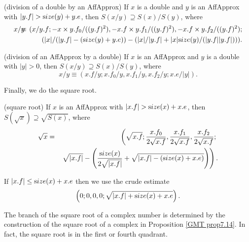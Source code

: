 \begin{proposition}{\label{GMT prop6.9} {\textrm (division of a double by an AffApprox)}} If $x$ is a double and $y$ is an {\textrm AffApprox }
 with $|y.f| > {\textrm size}(y) + y.e${\textrm ,} then $S(x / y) \supseteq S(x) / S(y)${\textrm ,} where
\begin{eqnarray*}
x / y &\hskip-8pt\equiv\hskip-8pt& (x / y.f; -x \times y.f_0 /((y.f)^2), 
-x.f \times y.f_1 /((y.f)^2), -x.f \times y.f_2 /((y.f)^2); 
\\
&\hskip-8pt\hskip-8pt&\qquad (|x|  /(|y.f| - ({\textrm size}(y) + y.e)) - 
(|x|/|y.f|  + |x| {\textrm size}(y)/(|y.f||y.f|))).
                                              \end{eqnarray*}
\end{proposition}


\begin{proposition}{\label{GMT prop6.10} {\textrm (division of an AffApprox by a double)}} If $x$ is an {\textrm AffApprox}  and $y$ is a double
with $|y| > 0${\textrm ,} then $S(x / y) \supseteq S(x) / S(y)${\textrm ,} where
$$
x / y \equiv (x.f / y; x.f_0 / y, 
x.f_1 / y, x.f_2 / y; 
x.e/ |y| ).
$$
\end{proposition}

Finally, we do the square root.

\begin{proposition}{\label{GMT prop6.11} {\textrm (square root)}} If $x$ is an {\textrm AffApprox}  with $|x.f| > {\textrm size}(x) + x.e${\textrm ,}
 then $S(\sqrt x)
\supseteq
\sqrt {S(x)}${\textrm ,} where
\begin{eqnarray*}
\sqrt x& = &\left(\sqrt {x.f}; 
 {x.f_0 \over 2 \sqrt {x.f}}, 
 {x.f_1 \over 2 \sqrt {x.f}}, 
 {x.f_2 \over 2 \sqrt {x.f}};
\right.\\
&& \left. \sqrt {|x.f|} - \left({{\textrm size}(x) \over 2 \sqrt {|x.f|}} + \sqrt {|x.f| - ({\textrm size}(x) + x.e)}\right)
                                              \right).
\end{eqnarray*}
\end{proposition} 
If $|x.f| \le {\textrm size}(x) + x.e$ then we use the crude estimate $$\left(0;0,0,0;\sqrt{|x.f| + {\textrm size}(x) + x.e}\right).$$
 
The branch of the square root of a complex number is determined by the construction of the square root of a complex in
Proposition \ref{GMT prop7.14}.
In fact, the square root is in the first or fourth quadrant.

